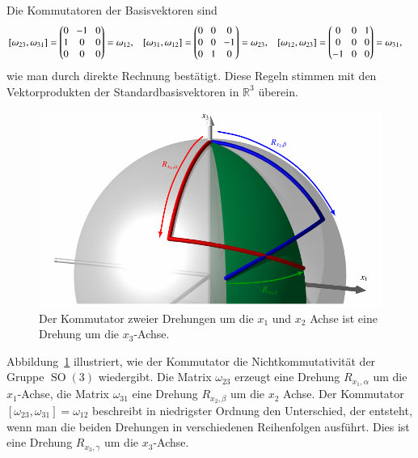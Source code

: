 Die Kommutatoren der Basisvektoren sind
\begin{equation}
\setlength\arraycolsep{4pt}
\begin{aligned}
[\omega_{23},\omega_{31}]
&=
\begin{pmatrix}
0&-1&0\\
1&0&0\\
0&0&0
\end{pmatrix}
=
\omega_{12},
&
[\omega_{31},\omega_{12}]
&=
\begin{pmatrix}
0&0&0\\
0&0&-1\\
0&1&0
\end{pmatrix}
=
\omega_{23},
&
[\omega_{12},\omega_{23}]
&=
\begin{pmatrix}
0&0&1\\
0&0&0\\
-1&0&0
\end{pmatrix}
=
\omega_{31},
\end{aligned}
\label{buch:gruppen:eqn:so3-kommutatoren}
\end{equation}
wie man durch direkte Rechnung bestätigt.
Diese Regeln stimmen mit den Vektorprodukten der Standardbasisvektoren
in $\mathbb{R}^3$ überein.

\begin{figure}
\centering
\includegraphics{chapters/60-gruppen/images/nichtkomm.pdf}
\caption{Der Kommutator zweier Drehungen um die $x_1$ und $x_2$
Achse ist eine Drehung um die $x_3$-Achse.
\label{buch:lie:fig:kommutator}}
\end{figure}
Abbildung~\ref{buch:lie:fig:kommutator} illustriert, wie der
Kommutator die Nichtkommutativität der Gruppe $\operatorname{SO}(3)$
wiedergibt.
Die Matrix $\omega_{23}$ erzeugt eine Drehung $R_{x_1,\alpha}$
um die $x_1$-Achse,
die Matrix $\omega_{31}$ eine Drehung $R_{x_2,\beta}$ um die $x_2$ Achse.
Der Kommutator $[\omega_{23},\omega_{31}]=\omega_{12}$ beschreibt in
niedrigster Ordnung den Unterschied, der entsteht, wenn man die
beiden Drehungen in verschiedenen Reihenfolgen ausführt.
Dies ist eine Drehung $R_{x_3,\gamma}$ um die $x_3$-Achse.

